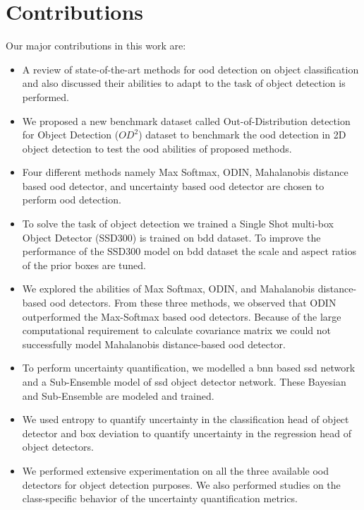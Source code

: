     \section{Contributions}
    Our major contributions in this work are:
    \begin{itemize}
        \item A review of state-of-the-art methods for \acrshort{ood} detection on object classification and also discussed their abilities to adapt to the task of object detection is performed.
        \item We proposed a new benchmark dataset called Out-of-Distribution detection for Object Detection ($OD^2$) dataset to benchmark the \acrshort{ood} detection in 2D object detection to test the \acrshort{ood} abilities of proposed methods.
        \item Four different methods namely Max Softmax, ODIN, Mahalanobis distance based \acrshort{ood} detector, and uncertainty based \acrshort{ood} detector are chosen to perform \acrshort{ood} detection.
        \item To solve the task of object detection we trained a Single Shot multi-box Object Detector (SSD300) is trained on \acrshort{bdd} dataset. To improve the performance of the SSD300 model on \acrshort{bdd} dataset the scale and aspect ratios of the prior boxes are tuned.
        \item We explored the abilities of Max Softmax, ODIN, and Mahalanobis distance-based \acrshort{ood} detectors. From these three methods, we observed that ODIN outperformed the Max-Softmax based \acrshort{ood} detectors. Because of the large computational requirement to calculate covariance matrix we could not successfully model Mahalanobis distance-based \acrshort{ood} detector.
        \item To perform uncertainty quantification, we modelled a \acrshort{bnn} based \acrshort{ssd} network and a Sub-Ensemble model of \acrshort{ssd} object detector network. These Bayesian and Sub-Ensemble are modeled and trained.
        \item We used entropy to quantify uncertainty in the classification head of object detector and box deviation to quantify uncertainty in the regression head of object detectors.
        \item We performed extensive experimentation on all the three available \acrshort{ood} detectors for object detection purposes. We also performed studies on the class-specific behavior of the uncertainty quantification metrics.
    \end{itemize}
        
